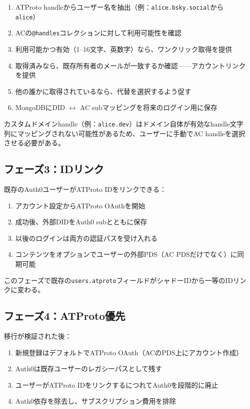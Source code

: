 \documentclass[10pt,letterpaper,twocolumn]{article}
\begin{document}
\begin{enumerate}
  \item ATProto handleからユーザー名を抽出（例：\texttt{alice.bsky.social}から\texttt{alice}）
  \item ACの\texttt{@handles}コレクションに対して利用可能性を確認
  \item 利用可能かつ有効（1--16文字、英数字）なら、ワンクリック取得を提供
  \item 取得済みなら、既存所有者のメールが一致するか確認——アカウントリンクを提供
  \item 他の誰かに取得されているなら、代替を選択するよう促す
  \item MongoDBにDID $\leftrightarrow$ AC subマッピングを将来のログイン用に保存
\end{enumerate}

カスタムドメインhandle（例：\texttt{alice.dev}）はドメイン自体が有効なhandle文字列にマッピングされない可能性があるため、ユーザーに手動でAC handleを選択させる必要がある。

\subsection{フェーズ3：IDリンク}

既存のAuth0ユーザーがATProto IDをリンクできる：

\begin{enumerate}
  \item アカウント設定からATProto OAuthを開始
  \item 成功後、外部DIDをAuth0 subとともに保存
  \item 以後のログインは両方の認証パスを受け入れる
  \item コンテンツをオプションでユーザーの外部PDS（AC PDSだけでなく）に同期可能
\end{enumerate}

このフェーズで既存の\texttt{users.atproto}フィールドがシャドーIDから一等のIDリンクに変わる。

\subsection{フェーズ4：ATProto優先}

移行が検証された後：

\begin{enumerate}
  \item 新規登録はデフォルトでATProto OAuth（ACのPDS上にアカウント作成）
  \item Auth0は既存ユーザーのレガシーパスとして残す
  \item ユーザーがATProto IDをリンクするにつれてAuth0を段階的に廃止
  \item Auth0依存を除去し、サブスクリプション費用を排除
\end{enumerate}
\end{document}
